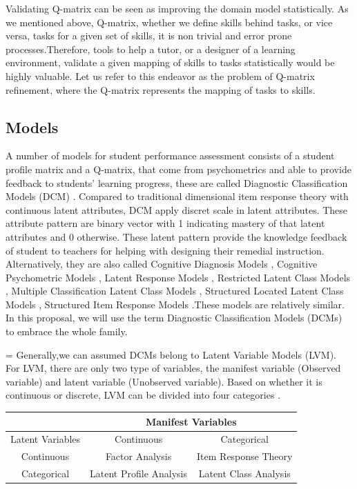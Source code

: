 \documentclass[11pt]{article}
\begin{document}
  Validating Q-matrix can be seen as improving the domain model statistically. As we mentioned above, Q-matrix, whether we define skills behind tasks, or vice versa, tasks for a given set of skills, it is non trivial and error prone processes.Therefore, tools to help a tutor, or a designer of a learning environment, validate a given mapping of skills to tasks statistically would be highly valuable. Let us refer to this endeavor as the problem of Q-matrix refinement, where the Q-matrix represents the mapping of tasks to skills.

\subsection{Models}
A number of models for student performance assessment consists of  a student profile matrix and a Q-matrix, that come from psychometrics and able to provide feedback to students' learning progress, these are called Diagnostic Classification Models (DCM) \cite{templin2010diagnostic}. Compared to traditional dimensional item response theory with continuous latent attributes, DCM apply discret scale in latent attributes. These attribute pattern are binary vector with 1 indicating  mastery of that latent attributes and 0 otherwise. These latent pattern provide the knowledge feedback of student to teachers for helping with designing their remedial instruction. Alternatively, they are also called Cognitive Diagnosis Models \cite{templin2006measurement}, Cognitive Psychometric Models \cite{rupp2007answer}, Latent Response Models \cite{maris1995psychometric}, Restricted Latent Class Models \cite{haertel1989using}, Multiple Classification Latent Class Models \cite{maris1999estimating}, Structured Located Latent Class Models \cite{xu2008fitting}, Structured Item Response Models \cite{rupp2007cognitive}.These models are relatively similar. In this proposal, we will use the term Diagnostic Classification Models (DCMs) to embrace the whole family.

\parskip = \baselineskip
Generally,we can assumed DCMs belong to Latent Variable Models (LVM). For LVM, there are only two type of variables, the manifest variable (Observed variable) and latent variable (Unobserved variable). Based on whether it is continuous or discrete, LVM can be divided into four categories \cite{galbraith2002analysis}.

\begin{tabular}{|c||c|c|}
\hline
          {} & \multicolumn{2}{c|}{Manifest Variables}\\ \hline \hline
 Latent Variables & Continuous & Categorical  \\ \hline
 Continuous & Factor Analysis & Item Response Theory \\ \hline
 Categorical & Latent Profile Analysis & Latent Class Analysis \\ \hline
\end{tabular}
\\
\end{document}
